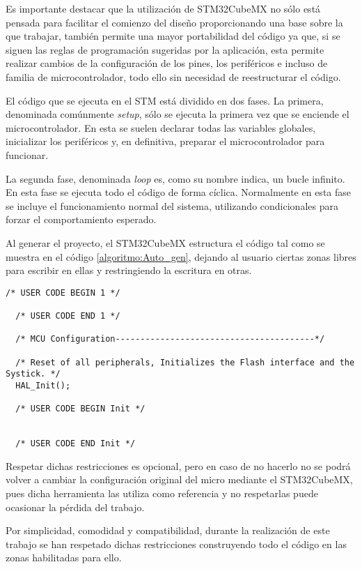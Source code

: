 Es importante destacar que la utilización de STM32CubeMX no sólo está pensada para facilitar el comienzo del diseño proporcionando una base sobre la que trabajar, también permite una mayor portabilidad del código ya que, si se siguen las reglas de programación sugeridas por la aplicación, esta permite realizar cambios de la configuración de los pines, los periféricos e incluso de familia de microcontrolador, todo ello sin necesidad de reestructurar el código.

\clearpage

El código que se ejecuta en el STM está dividido en dos fases. La primera, denominada comúnmente \textit{setup}, sólo se ejecuta la primera vez que se enciende el microcontrolador.
En esta se suelen declarar todas las variables globales, inicializar los periféricos y, en definitiva, preparar el microcontrolador para funcionar.

La segunda fase, denominada \textit{loop} es, como su nombre indica, un bucle infinito. En esta fase se ejecuta todo el código de forma cíclica. Normalmente en esta fase se incluye el funcionamiento normal del sistema, utilizando condicionales para forzar el comportamiento esperado.

Al generar el proyecto, el STM32CubeMX estructura el código tal como se muestra en el código \ref{algoritmo:Auto_gen}, dejando al usuario ciertas zonas libres para escribir en ellas y restringiendo la escritura en otras.

\begin{lstlisting}[label=algoritmo:Auto_gen,style = STM-code,frame=single,caption=Ejemplo de generación de código automáticamente]
  /* USER CODE BEGIN 1 */
	
  /* USER CODE END 1 */

  /* MCU Configuration----------------------------------------*/

  /* Reset of all peripherals, Initializes the Flash interface and the Systick. */
  HAL_Init();

  /* USER CODE BEGIN Init */

	
  /* USER CODE END Init */
\end{lstlisting}

Respetar dichas restricciones es opcional, pero en caso de no hacerlo no se podrá volver a cambiar la configuración original del micro mediante el STM32CubeMX, pues dicha herramienta las utiliza como referencia y no respetarlas puede ocasionar la pérdida del trabajo.

Por simplicidad, comodidad y compatibilidad, durante la realización de este trabajo se han respetado dichas restricciones construyendo todo el código en las zonas habilitadas para ello.

